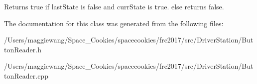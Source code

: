 \begin{DoxyReturn}{Returns}
true if last\+State is false and curr\+State is true. else returns false. 
\end{DoxyReturn}


The documentation for this class was generated from the following files\+:\begin{DoxyCompactItemize}
\item 
/\+Users/maggiewang/\+Space\+\_\+\+Cookies/spacecookies/frc2017/src/\+Driver\+Station/Button\+Reader.\+h\item 
/\+Users/maggiewang/\+Space\+\_\+\+Cookies/spacecookies/frc2017/src/\+Driver\+Station/Button\+Reader.\+cpp\end{DoxyCompactItemize}
